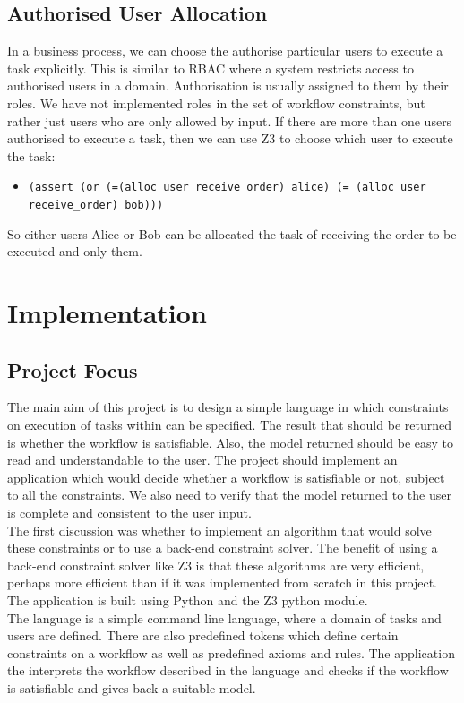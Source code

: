 \documentclass[a4paper]{report}
\begin{document}
\section{Authorised User Allocation}
In a business process, we can choose the authorise particular users to execute a task explicitly. This is similar to RBAC\cite{rbac} where a system restricts access to authorised users in a domain. Authorisation is usually assigned to them by their roles. We have not implemented roles in the set of workflow constraints, but rather just users who are only allowed by input. If there are more than one users authorised to execute a task, then we can use Z3 to choose which user to execute the task:
\begin{itemize}
\item \texttt{(assert (or (=(alloc\_user receive\_order) alice) (= (alloc\_user receive\_order) bob)))
}
\end{itemize}
So either users Alice or Bob can be allocated the task of receiving the order to be executed and only them.

\chapter{Implementation}
\section{Project Focus}
The main aim of this project is to design a simple language in which constraints on execution of tasks within can be specified. The result that should be returned is whether the workflow is satisfiable. Also, the model returned should be easy to read and understandable to the user. The project should implement an application which would decide whether a workflow is satisfiable or not, subject to all the constraints. We also need to verify that the model returned to the user is complete and consistent to the user input.\\
The first discussion was whether to implement an algorithm that would solve these constraints or to use a back-end constraint solver. The benefit of using a back-end constraint solver like Z3 is that these algorithms are very efficient, perhaps more efficient than if it was implemented from scratch in this project. The application is built using Python\cite{python} and the Z3 python module\cite{Z3Python}. \\
The language is a simple command line language, where a domain of tasks and users are defined. There are also predefined tokens which define certain constraints on a workflow as well as predefined axioms and rules. The application the interprets the workflow described in the language and checks if the workflow is satisfiable and gives back a suitable model.
\end{document}
